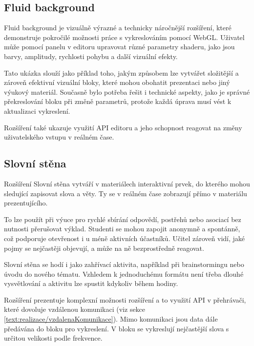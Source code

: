\subsection{Fluid background}

Fluid background je vizuálně výrazné a technicky náročnější rozšíření, které demonstruje pokročilé možnosti práce s vykreslováním pomocí WebGL.
Uživatel může pomocí panelu v editoru upravovat různé parametry shaderu, jako jsou barvy, amplitudy, rychlosti pohybu a další vizuální efekty.

Tato ukázka slouží jako příklad toho, jakým způsobem lze vytvářet složitější a zároveň efektivní vizuální bloky, které mohou obohatit prezentaci nebo jiný výukový materiál. 
Současně bylo potřeba řešit i technické aspekty, jako je správné překreslování bloku při změně parametrů, protože každá úprava musí vést k aktualizaci vykreslení.

Rozšíření také ukazuje využití API editoru a jeho schopnost reagovat na změny uživatelského vstupu v reálném čase.

\subsection{Slovní stěna}


Rozšíření Slovní stěna vytváří v materiálech interaktivní prvek, do kterého mohou sledující zapisovat slova a věty. 
Ty se v reálném čase zobrazují přímo v materiálu prezentujícího.

To lze použít při výuce pro rychlé sbírání odpovědí, postřehů nebo asociací bez nutnosti přerušovat výklad. 
Studenti se mohou zapojit anonymně a spontánně, což podporuje otevřenost i u méně aktivních účastníků. 
Učitel zároveň vidí, jaké pojmy se nejčastěji objevují, a může na ně bezprostředně reagovat.

Slovní stěna se hodí i jako zahřívací aktivita, například při brainstormingu nebo úvodu do nového tématu. 
Vzhledem k jednoduchému formátu není třeba dlouhé vysvětlování a aktivitu lze spustit kdykoliv během hodiny.

Rozšíření prezentuje komplexní možnosti rozšíření a to využití API v přehrávači, které dovoluje vzdálenou komunikaci (viz sekce \ref{text:realizace/vzdalenaKomunikace}).
Mimo komunikaci jsou data dále předávána do bloku pro vykreslení.
V bloku se vykreslují nejčastější slova s určitou velikosti podle frekvence.

